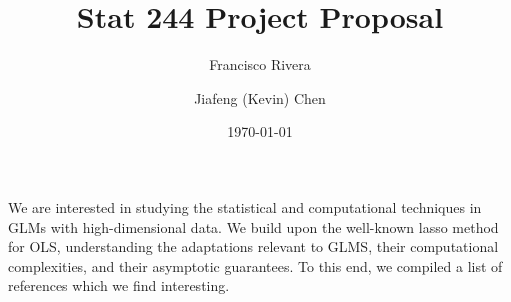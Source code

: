 \documentclass[a4paper]{article}
\begin{document}
\title{Stat 244 Project Proposal}
\author{Francisco Rivera \and Jiafeng (Kevin) Chen}
\date{\today}

\maketitle

We are interested in studying the statistical and computational techniques in
GLMs with high-dimensional data. We build upon the well-known lasso method for
OLS, understanding the adaptations relevant to GLMS, their computational
complexities, and their asymptotic guarantees. To this end, we compiled a list
of references which we find interesting.


\nocite{*}


\end{document}

